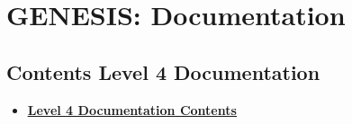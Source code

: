 \documentclass[12pt]{article}
\begin{document}
\section*{GENESIS: Documentation}

\subsection*{Contents Level 4 Documentation}

\begin{itemize}

\item \href{../contents-level4/contents-level4.pdf}{\bf \underline{Level 4 Documentation Contents}}


\end{itemize}

\end{document}
